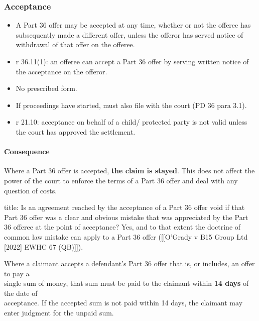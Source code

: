 \documentclass[
]{article}
\newenvironment{Shaded}{}{}
\newcommand{\NormalTok}[1]{#1}
\providecommand{\tightlist}{%
  \setlength{\itemsep}{0pt}\setlength{\parskip}{0pt}}
\begin{document}
\hypertarget{acceptance}{%
\subsubsection{Acceptance}\label{acceptance}}

\begin{itemize}
\tightlist
\item
  A Part 36 offer may be accepted at any time, whether or not the
  offeree has subsequently made a different offer, unless the offeror
  has served notice of withdrawal of that offer on the offeree.
\item
  r 36.11(1): an offeree can accept a Part 36 offer by serving written
  notice of the acceptance on the offeror.
\item
  No prescribed form.
\item
  If proceedings have started, must also file with the court (PD 36 para
  3.1).
\item
  r 21.10: acceptance on behalf of a child/ protected party is not valid
  unless the court has approved the settlement.
\end{itemize}

\hypertarget{consequence}{%
\paragraph{Consequence}\label{consequence}}

Where a Part 36 offer is accepted, \textbf{the claim is stayed}. This
does not affect the power of the court to enforce the terms of a Part 36
offer and deal with any question of costs.

\begin{Shaded}
\begin{Highlighting}[]
\NormalTok{title: Is an agreement reached by the acceptance of a Part 36 offer void if that Part 36 offer was a clear and obvious mistake that was appreciated by the Part 36 offeree at the point of acceptance? }
\NormalTok{Yes, and to that extent the doctrine of common law mistake can apply to a Part 36 offer ([[O’Grady v B15 Group Ltd [2022] EWHC 67 (QB)]]).}
\end{Highlighting}
\end{Shaded}

Where a claimant accepts a defendant's Part 36 offer that is, or
includes, an offer to pay a\\
single sum of money, that sum must be paid to the claimant within
\textbf{14 days} of the date of\\
acceptance. If the accepted sum is not paid within 14 days, the claimant
may enter judgment for the unpaid sum.
\end{document}
